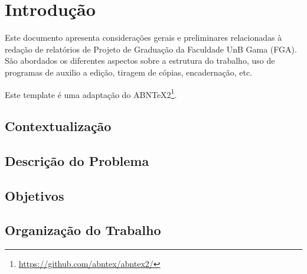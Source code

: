 \chapter [Introdução]{Introdução}

Este documento apresenta considerações gerais e preliminares relacionadas 
à redação de relatórios de Projeto de Graduação da Faculdade UnB Gama 
(FGA). São abordados os diferentes aspectos sobre a estrutura do trabalho, 
uso de programas de auxilio a edição, tiragem de cópias, encadernação, etc.

Este template é uma adaptação do ABNTeX2\footnote{\url{https://github.com/abntex/abntex2/}}.

\section{Contextualização}

\section{Descrição do Problema}

\section{Objetivos}

\section{Organização do Trabalho}


